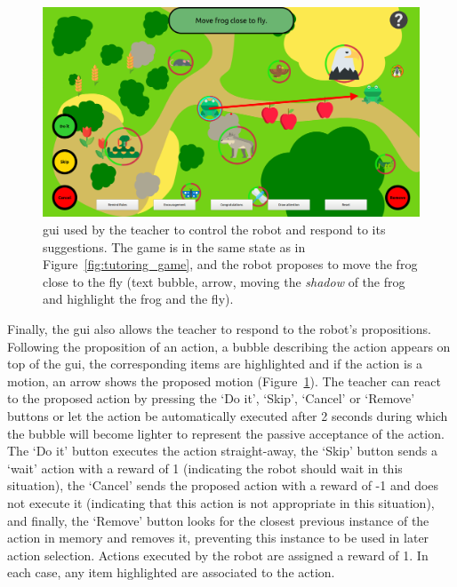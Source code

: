 \begin{figure}[ht]
	\centering
	\includegraphics[width=1\textwidth]{gui.png}
	\caption{\gls{gui} used by the teacher to control the robot and respond to its suggestions. The game is in the same state as in Figure~\ref{fig:tutoring_game}, and the robot proposes to move the frog close to the fly (text bubble, arrow, moving the \textit{shadow} of the frog and highlight the frog and the fly).}
	\label{fig:tutoring_gui}
\end{figure}

Finally, the \gls{gui} also allows the teacher to respond to the robot's propositions. Following the proposition of an action, a bubble describing the action appears on top of the \gls{gui}, the corresponding items are highlighted and if the action is a motion, an arrow shows the proposed motion (Figure~\ref{fig:tutoring_gui}). The teacher can react to the proposed action by pressing the `Do it', `Skip', `Cancel' or `Remove' buttons or let the action be automatically executed after 2 seconds during which the bubble will become lighter to represent the passive acceptance of the action. The `Do it' button executes the action straight-away, the `Skip' button sends a `wait' action with a reward of 1 (indicating the robot should wait in this situation), the `Cancel' sends the proposed action with a reward of -1 and does not execute it (indicating that this action is not appropriate in this situation), and finally, the `Remove' button looks for the closest previous instance of the action in memory and removes it, preventing this instance to be used in later action selection. Actions executed by the robot are assigned a reward of 1. In each case, any item highlighted are associated to the action. 

